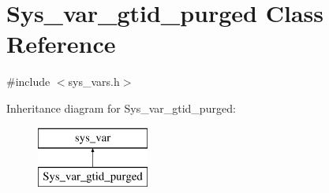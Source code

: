 \hypertarget{classSys__var__gtid__purged}{}\section{Sys\+\_\+var\+\_\+gtid\+\_\+purged Class Reference}
\label{classSys__var__gtid__purged}


{\ttfamily \#include $<$sys\+\_\+vars.\+h$>$}

Inheritance diagram for Sys\+\_\+var\+\_\+gtid\+\_\+purged\+:\begin{figure}[H]
\begin{center}
\leavevmode
\includegraphics[height=2.000000cm]{classSys__var__gtid__purged}
\end{center}
\end{figure}
